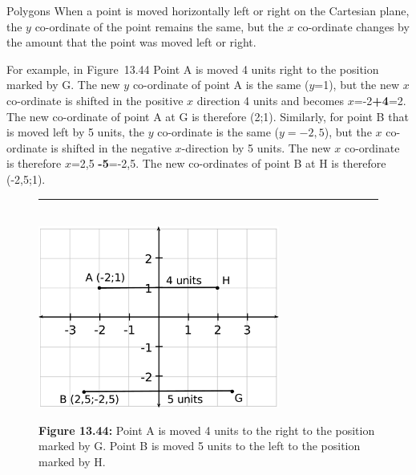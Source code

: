 \begin{exercises}{Polygons}
        \label{m39358*id70955}When a point is moved horizontally left or right on the Cartesian plane, the $y$ co-ordinate of the point remains the same, but the $x$ co-ordinate changes by the amount that the point was moved left or right.\par 
        \label{m39358*id70977}For example, in Figure~13.44 Point A is moved 4 units right to the position marked by G. The new $y$ co-ordinate of point A is the same ($y$=1), but the new $x$ co-ordinate is shifted in the positive $x$ direction 4 units and becomes $x$=-2\textbf{+4}=2. The new co-ordinate of point A at G is therefore (2;1). Similarly, for point B that is moved left by 5 units, the $y$ co-ordinate is the same ($y=-2,5$), but the $x$ co-ordinate is shifted in the negative $x$-direction by 5 units. The new $x$ co-ordinate is therefore $x$=2,5 \textbf{-5}=-2,5. The new co-ordinates of point B at H is therefore (-2,5;1).\par 
        
    \setcounter{subfigure}{0}


	\begin{figure}[H] %
    \begin{center}
    \rule[.1in]{\figurerulewidth}{.005in} \\
        \label{m39358*uid7134!!!underscore!!!media}\label{m39358*uid71!!!underscore!!!printimage}\includegraphics[width=300px]{col11306.imgs/m39358_MG10C14_025.png} %
        
      \vspace{2pt}
    \vspace{\rubberspace}\par \begin{cnxcaption}
	  \small \textbf{Figure 13.44: }Point A is moved 4 units to the right to the position marked by G. Point B is moved 5 units to the left to the position marked by H.
	\end{cnxcaption}
      

\end{center}
\end{figure}
\end{exercises}
